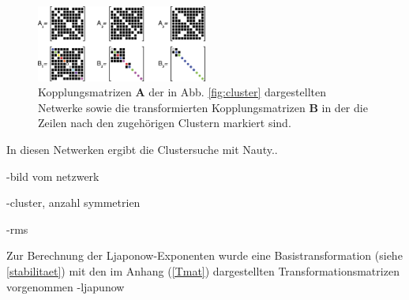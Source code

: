 \begin{figure}
	\centering
	\includegraphics[width=0.5\textwidth]{abb/misc/ABMat.png}
	\caption[Kopplungsmatritzen und ihre Transformierten]{Kopplungsmatrizen $\boldsymbol{A}$ der in Abb. \ref{fig:cluster} dargestellten Netwerke sowie die transformierten Kopplungsmatrizen $\boldsymbol{B}$ in der die Zeilen nach den zugehörigen Clustern markiert sind\cite{pecora2014}.}
\label{fig:abmat}
\end{figure}

In diesen Netwerken ergibt die Clustersuche mit Nauty..


-bild vom netzwerk

-cluster, anzahl symmetrien

-rms

Zur Berechnung der Ljaponow-Exponenten wurde eine Basistransformation (siehe \ref{stabilitaet}) mit den im Anhang (\ref{Tmat}) dargestellten Transformationsmatrizen vorgenommen \cite{pecora2014,sagenotebook}
-ljapunow

